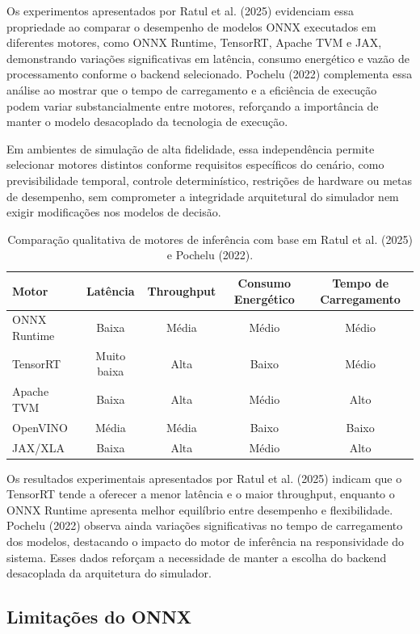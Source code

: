 Os experimentos apresentados por Ratul et al. (2025) evidenciam essa propriedade ao comparar o desempenho de modelos ONNX executados em diferentes motores, como ONNX Runtime, TensorRT, Apache TVM e JAX, demonstrando variações significativas em latência, consumo energético e vazão de processamento conforme o backend selecionado. Pochelu (2022) complementa essa análise ao mostrar que o tempo de carregamento e a eficiência de execução podem variar substancialmente entre motores, reforçando a importância de manter o modelo desacoplado da tecnologia de execução.

Em ambientes de simulação de alta fidelidade, essa independência permite selecionar motores distintos conforme requisitos específicos do cenário, como previsibilidade temporal, controle determinístico, restrições de hardware ou metas de desempenho, sem comprometer a integridade arquitetural do simulador nem exigir modificações nos modelos de decisão.

\begin{table}[h]
\centering
\begin{tabular}{lcccc}
\hline
\textbf{Motor} & \textbf{Latência} & \textbf{Throughput} & \textbf{Consumo Energético} & \textbf{Tempo de Carregamento} \\
\hline
ONNX Runtime & Baixa & Média & Médio & Médio \\
TensorRT & Muito baixa & Alta & Baixo & Médio \\
Apache TVM & Baixa & Alta & Médio & Alto \\
OpenVINO & Média & Média & Baixo & Baixo \\
JAX/XLA & Baixa & Alta & Médio & Alto \\
\hline
\end{tabular}
\caption{Comparação qualitativa de motores de inferência com base em Ratul et al. (2025) e Pochelu (2022).}
\label{tab:comparacao_motores}
\end{table}

Os resultados experimentais apresentados por Ratul et al. (2025) indicam que o TensorRT tende a oferecer a menor latência e o maior throughput, enquanto o ONNX Runtime apresenta melhor equilíbrio entre desempenho e flexibilidade. Pochelu (2022) observa ainda variações significativas no tempo de carregamento dos modelos, destacando o impacto do motor de inferência na responsividade do sistema. Esses dados reforçam a necessidade de manter a escolha do backend desacoplada da arquitetura do simulador.

\subsection{Limitações do ONNX}

